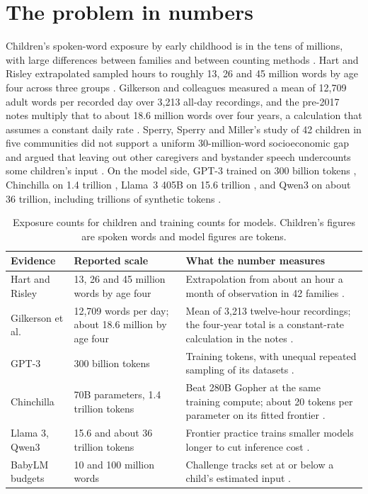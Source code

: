 \section{The problem in numbers}
Children's spoken-word exposure by early childhood is in the tens of millions, with large differences between families and between counting methods \cite{pre47}. Hart and Risley extrapolated sampled hours to roughly 13, 26 and 45 million words by age four across three groups \cite{pre45}. Gilkerson and colleagues measured a mean of 12,709 adult words per recorded day over 3,213 all-day recordings, and the pre-2017 notes multiply that to about 18.6 million words over four years, a calculation that assumes a constant daily rate \cite{pre46}. Sperry, Sperry and Miller's study of 42 children in five communities did not support a uniform 30-million-word socioeconomic gap and argued that leaving out other caregivers and bystander speech undercounts some children's input \cite{pre47}. On the model side, GPT-3 trained on 300 billion tokens \cite{pre55}, Chinchilla on 1.4 trillion \cite{pre54}, Llama~3 405B on 15.6 trillion \cite{post84}, and Qwen3 on about 36 trillion, including trillions of synthetic tokens \cite{post85}.

\begin{table}[ht]
\centering\small
\begin{tabular}{p{3.0cm}p{3.4cm}p{7.6cm}}
\toprule
Evidence & Reported scale & What the number measures \\
\midrule
Hart and Risley & 13, 26 and 45 million words by age four & Extrapolation from about an hour a month of observation in 42 families \cite{pre45}. \\
Gilkerson et al. & 12,709 words per day; about 18.6 million by age four & Mean of 3,213 twelve-hour recordings; the four-year total is a constant-rate calculation in the notes \cite{pre46}. \\
GPT-3 & 300 billion tokens & Training tokens, with unequal repeated sampling of its datasets \cite{pre55}. \\
Chinchilla & 70B parameters, 1.4 trillion tokens & Beat 280B Gopher at the same training compute; about 20 tokens per parameter on its fitted frontier \cite{pre54}. \\
Llama 3, Qwen3 & 15.6 and about 36 trillion tokens & Frontier practice trains smaller models longer to cut inference cost \cite{post84,post85}. \\
BabyLM budgets & 10 and 100 million words & Challenge tracks set at or below a child's estimated input \cite{post81}. \\
\bottomrule
\end{tabular}
\caption{Exposure counts for children and training counts for models. Children's figures are spoken words and model figures are tokens.}
\label{tab:scale}
\end{table}

